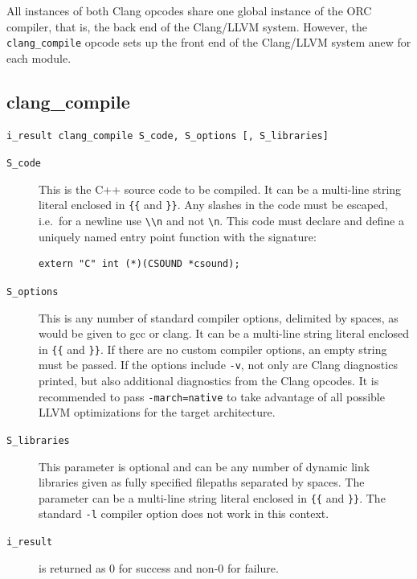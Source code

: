 \documentclass[letterpaper, 12pt]{article}
\begin{document}
All instances of both Clang opcodes share one global instance of the ORC compiler, that is, the back end of the Clang/LLVM system. However, the \verb|clang_compile| opcode sets up the front end of the Clang/LLVM system anew for each module.

\subsection{clang\_compile}

\begin{Verbatim}[fontfamily=courier, xleftmargin=\parindent]
i_result clang_compile S_code, S_options [, S_libraries]
\end{Verbatim}

\begin{description}
\item[\texttt{S\_code}] This is the C++ source code to be compiled. It can be a multi-line string literal enclosed in \verb|{{| and \verb|}}|. Any slashes in the code must be escaped, i.e.\ for a newline use \verb|\\n| and not \verb|\n|. This code must declare and define a 
uniquely named entry point function with the signature:

\begin{Verbatim}[fontfamily=courier, xleftmargin=\parindent]
extern "C" int (*)(CSOUND *csound);
\end{Verbatim}

\item[\texttt{S\_options}] This is any number of standard compiler options, delimited by spaces, as would be given to gcc or clang. It can be a multi-line string literal enclosed in \verb|{{| and \verb|}}|. If there are no custom compiler options, an empty string must be passed. If the options include \verb|-v|, not only are Clang diagnostics printed, but also additional diagnostics from the Clang opcodes. It is recommended to pass \verb|-march=native| to take advantage of all possible LLVM optimizations for the target architecture.
\item[\texttt{S\_libraries}] This parameter is optional and can be any number of dynamic link libraries given as fully specified filepaths separated by spaces. The parameter can be a multi-line string literal enclosed in \verb|{{| and \verb|}}|. The standard \texttt{-l} compiler option does not work in this context.
\item[\texttt{i\_result}] is returned as 0 for success and non-0 for failure. 
\end{description}
\end{document}
